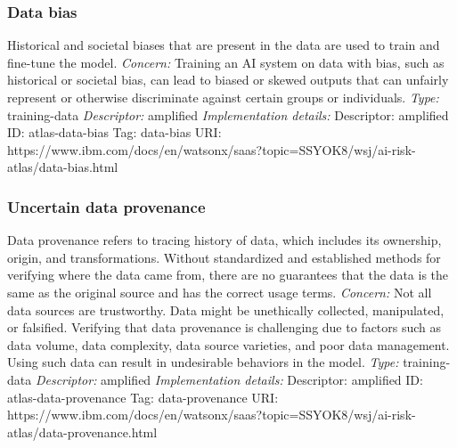 \documentclass{article}
\begin{document}
\subsubsection*{Data bias}
Historical and societal biases that are present in the data are used to train and fine-tune the model.
\newline
\textit{Concern: }Training an AI system on data with bias, such as historical or societal bias, can lead to biased or skewed outputs that can unfairly represent or otherwise discriminate against certain groups or individuals.\newline\newline
\textit{Type: }training-data\newline
\textit{Descriptor: }amplified \newline\newline
\textit{Implementation details:} \newline
Descriptor: amplified \newline
ID: atlas-data-bias \newline
Tag: data-bias \newline
URI:  https://www.ibm.com/docs/en/watsonx/saas?topic=SSYOK8/wsj/ai-risk-atlas/data-bias.html\newline
\subsubsection*{Uncertain data provenance}
Data provenance refers to tracing history of data, which includes its ownership, origin, and transformations. Without standardized and established methods for verifying where the data came from, there are no guarantees that the data is the same as the original source and has the correct usage terms.\newline
\textit{Concern: }Not all data sources are trustworthy. Data might be unethically collected, manipulated, or falsified. Verifying that data provenance is challenging due to factors such as data volume, data complexity, data source varieties, and poor data management. Using such data can result in undesirable behaviors in the model.\newline\newline
\textit{Type: }training-data\newline
\textit{Descriptor: }amplified \newline\newline
\textit{Implementation details:} \newline
Descriptor: amplified \newline
ID: atlas-data-provenance \newline
Tag: data-provenance \newline
URI:  https://www.ibm.com/docs/en/watsonx/saas?topic=SSYOK8/wsj/ai-risk-atlas/data-provenance.html\newline
\end{document}
